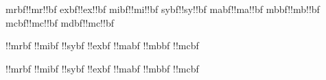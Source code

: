 \unprotect


\chardef\mrbffam\itfam \edef\c!mrbf{\c!mr\c!bf} \let\hexmrbffam\hexitfam %
\chardef\exbffam\slfam \edef\c!exbf{\c!ex\c!bf} \let\hexexbffam\hexslfam %
\chardef\mibffam\bffam \edef\c!mibf{\c!mi\c!bf} \let\hexmibffam\hexbffam %
\chardef\sybffam\nnfam \edef\c!sybf{\c!sy\c!bf} \let\hexsybffam\hexnnfam %
\chardef\mabffam\bsfam \edef\c!mabf{\c!ma\c!bf} \let\hexmabffam\hexbsfam %
\chardef\mbbffam\bifam \edef\c!mbbf{\c!mb\c!bf} \let\hexmbbffam\hexbifam %
\chardef\mcbffam\scfam \edef\c!mcbf{\c!mc\c!bf} \let\hexmcbffam\hexscfam %
\chardef\mdbffam\scfam \edef\c!mdbf{\c!mc\c!bf} \let\hexmdbffam\hexscfam %


\newtoks \boldmathstrategies
\newtoks \boldsymbstrategies

\appendtoks
  \dosetmathfamily\mrbffam\textface\scriptface\scriptscriptface\c!mrbf\mrfallback
  \dosetmathfamily\mibffam\textface\scriptface\scriptscriptface\c!mibf\empty
  \dosetskewchar{}
  \dosetmathfamily\sybffam\textface\scriptface\scriptscriptface\c!sybf\empty
  \dosetskewchar{}
  \dosetmathfamily\exbffam\textface\textface  \textface        \c!exbf\empty
  \dosetmathfamily\mabffam\textface\scriptface\scriptscriptface\c!mabf\empty
  \dosetmathfamily\mbbffam\textface\scriptface\scriptscriptface\c!mbbf\empty
  \dosetmathfamily\mcbffam\textface\scriptface\scriptscriptface\c!mcbf\empty
\to \boldmathstrategies

\appendtoks
  \dosetsymbfamily\mrbffam\textface\scriptface\scriptscriptface\c!mrbf
  \dosetsymbfamily\mibffam\textface\scriptface\scriptscriptface\c!mibf
  \dosetsymbfamily\sybffam\textface\scriptface\scriptscriptface\c!sybf
  \dosetsymbfamily\exbffam\textface\textface  \textface        \c!exbf
  \dosetsymbfamily\mabffam\textface\scriptface\scriptscriptface\c!mabf
  \dosetsymbfamily\mbbffam\textface\scriptface\scriptscriptface\c!mbbf
  \dosetsymbfamily\mcbffam\textface\scriptface\scriptscriptface\c!mcbf
\to \boldsymbstrategies

